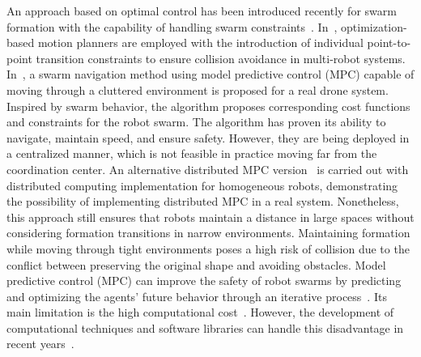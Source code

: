 An approach based on optimal control has been introduced recently for swarm formation with the capability of handling swarm constraints~\cite{Beaver2021}. In~\cite{7828016,Wu2020}, optimization-based motion planners are employed with the introduction of individual point-to-point transition constraints to ensure collision avoidance in multi-robot systems. In~\cite{Soria2021}, a swarm navigation method using model predictive control (MPC) capable of moving through a cluttered environment is proposed for a real drone system. Inspired by swarm behavior, the algorithm proposes corresponding cost functions and constraints for the robot swarm. The algorithm has proven its ability to navigate, maintain speed, and ensure safety. However, they are being deployed in a centralized manner, which is not feasible in practice moving far from the coordination center. An alternative distributed MPC version~\cite{9562281} is carried out with distributed computing implementation for homogeneous robots, demonstrating the possibility of implementing distributed MPC in a real system. Nonetheless, this approach still ensures that robots maintain a distance in large spaces without considering formation transitions in narrow environments. Maintaining formation while moving through tight environments poses a high risk of collision due to the conflict between preserving the original shape and avoiding obstacles. Model predictive control (MPC) can improve the safety of robot swarms by predicting and optimizing the agents' future behavior through an iterative process~\cite{Soria2021,8950150}. Its main limitation is the high computational cost~\cite{9910373,Bui2022}. However, the development of computational techniques and software libraries can handle this disadvantage in recent years~\cite{Soria2021,Bui2022,2020SciPy-NMeth}. 

